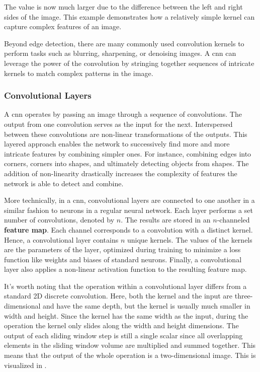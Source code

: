 The value is now much larger due to the difference between the left and right sides of the image. This example demonstrates how a relatively simple kernel can capture complex features of an image.

Beyond edge detection, there are many commonly used convolution kernels to perform tasks such as blurring, sharpening, or denoising images. A \ac{cnn} can leverage the power of the convolution by stringing together sequences of intricate kernels to match complex patterns in the image.

\subsubsection{Convolutional Layers}

A \ac{cnn} operates by passing an image through a sequence of convolutions. The output from one convolution serves as the input for the next. Interspersed between these convolutions are non-linear transformations of the outputs. This layered approach enables the network to successively find more and more intricate features by combining simpler ones. For instance, combining edges into corners, corners into shapes, and ultimately detecting objects from shapes. The addition of non-linearity drastically increases the complexity of features the network is able to detect and combine.

More technically, in a \ac{cnn}, convolutional layers are connected to one another in a similar fashion to neurons in a regular neural network. Each layer performs a set number of convolutions, denoted by $n$. The results are stored in an $n$-channeled \textbf{feature map}. Each channel corresponds to a convolution with a distinct kernel. Hence, a convolutional layer contains $n$ unique kernels. The values of the kernels are the parameters of the layer, optimized during training to minimize a loss function like weights and biases of standard neurons. Finally, a convolutional layer also applies a non-linear activation function to the resulting feature map.

It's worth noting that the operation within a convolutional layer differs from a standard 2D discrete convolution. Here, both the kernel and the input are three-dimensional and have the same depth, but the kernel is usually much smaller in width and height. Since the kernel has the same width as the input, during the operation the kernel only slides along the width and height dimensions. The output of each sliding window step is still a single scalar since all overlapping elements in the sliding window volume are multiplied and summed together. This means that the output of the whole operation is a two-dimensional image. This is visualized in .

